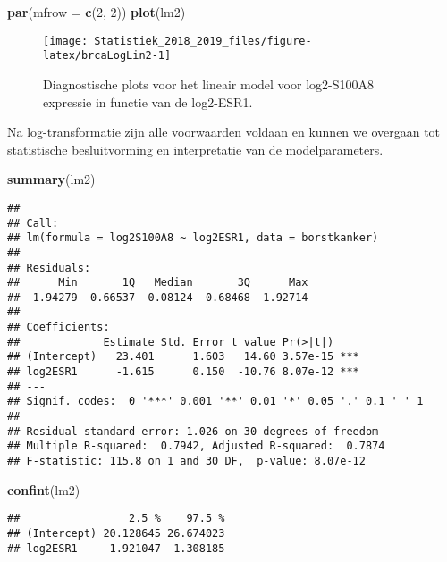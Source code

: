 \documentclass[12pt,dutch,coursenotes]{book}
\newenvironment{Shaded}{\begin{snugshade}}{\end{snugshade}}
\newcommand{\KeywordTok}[1]{\textcolor[rgb]{0.13,0.29,0.53}{\textbf{#1}}}
\newcommand{\DataTypeTok}[1]{\textcolor[rgb]{0.13,0.29,0.53}{#1}}
\newcommand{\DecValTok}[1]{\textcolor[rgb]{0.00,0.00,0.81}{#1}}
\newcommand{\NormalTok}[1]{#1}
\theoremstyle{definition}
\theoremstyle{definition}
\theoremstyle{definition}
\theoremstyle{remark}
\begin{document}
\begin{Shaded}
\begin{Highlighting}[]
\KeywordTok{par}\NormalTok{(}\DataTypeTok{mfrow =} \KeywordTok{c}\NormalTok{(}\DecValTok{2}\NormalTok{, }\DecValTok{2}\NormalTok{))}
\KeywordTok{plot}\NormalTok{(lm2)}
\end{Highlighting}
\end{Shaded}

\begin{figure}

{\centering \texttt{[image: Statistiek\_2018\_2019\_files/figure-latex/brcaLogLin2-1]} 

}

\caption{Diagnostische plots voor het lineair model voor log2-S100A8 expressie in functie van de log2-ESR1.}\label{fig:brcaLogLin2}
\end{figure}

Na log-transformatie zijn alle voorwaarden voldaan en kunnen we overgaan
tot statistische besluitvorming en interpretatie van de modelparameters.

\begin{Shaded}
\begin{Highlighting}[]
\KeywordTok{summary}\NormalTok{(lm2)}
\end{Highlighting}
\end{Shaded}

\begin{verbatim}
## 
## Call:
## lm(formula = log2S100A8 ~ log2ESR1, data = borstkanker)
## 
## Residuals:
##      Min       1Q   Median       3Q      Max 
## -1.94279 -0.66537  0.08124  0.68468  1.92714 
## 
## Coefficients:
##             Estimate Std. Error t value Pr(>|t|)    
## (Intercept)   23.401      1.603   14.60 3.57e-15 ***
## log2ESR1      -1.615      0.150  -10.76 8.07e-12 ***
## ---
## Signif. codes:  0 '***' 0.001 '**' 0.01 '*' 0.05 '.' 0.1 ' ' 1
## 
## Residual standard error: 1.026 on 30 degrees of freedom
## Multiple R-squared:  0.7942, Adjusted R-squared:  0.7874 
## F-statistic: 115.8 on 1 and 30 DF,  p-value: 8.07e-12
\end{verbatim}

\begin{Shaded}
\begin{Highlighting}[]
\KeywordTok{confint}\NormalTok{(lm2)}
\end{Highlighting}
\end{Shaded}

\begin{verbatim}
##                 2.5 %    97.5 %
## (Intercept) 20.128645 26.674023
## log2ESR1    -1.921047 -1.308185
\end{verbatim}
\end{document}
